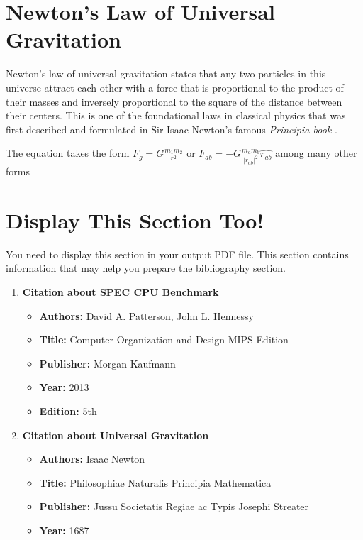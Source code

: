 \documentclass[11pt]{article}
\begin{document}
\newpage

\section*{Newton’s Law of Universal Gravitation}

\noindent Newton’s law of universal gravitation states that any two particles in this universe attract each other with a force that is proportional to the product of their masses and inversely proportional to the square of the distance between their centers. This is one of the foundational laws in classical physics that was first described and formulated in Sir Isaac Newton’s
famous \textit{Principia book} \cite{newton2016principia} .

The equation takes the form $F_g = G \frac{m_1 m_2}{r^2}$ or $F_{ab} = -G \frac{m_a m_b}{|r_{ab}|^2} \hat{r_{ab}} $ among many other forms

\section*{Display This Section Too!}
You need to display this section in your output PDF file. This section contains information that may help you prepare the bibliography section.
\begin{enumerate}
    \item \textbf{Citation about SPEC CPU Benchmark}
    \begin{itemize}
        \item  \textbf{Authors:} David A. Patterson, John L. Hennessy
        \item \textbf{Title:} Computer Organization and Design MIPS Edition 
        \item \textbf{Publisher:} Morgan Kaufmann 
        \item \textbf{Year:} 2013
        \item \textbf{Edition:} 5th
    \end{itemize}
    \item \textbf{Citation about Universal Gravitation}
    \begin{itemize}
        \item \textbf{Authors:} Isaac Newton 
        \item \textbf{Title:} Philosophiae Naturalis Principia Mathematica 
        \item \textbf{Publisher:} Jussu Societatis Regiae ac Typis Josephi Streater
        \item \textbf{Year:} 1687
    \end{itemize}
\end{enumerate}



% 
% 



    
\end{document}
